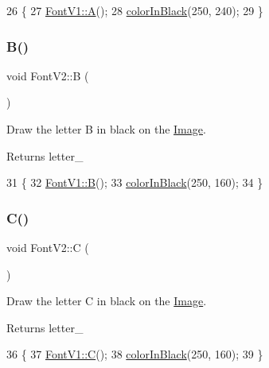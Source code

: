\begin{DoxyCode}
26                \{
27     \mbox{\hyperlink{class_font_v1_a29afd2079bc41cdec9d3de6bb4e1be52}{FontV1::A}}();
28     \mbox{\hyperlink{class_font_v2_a04f2501961bc286ce70fbb6a840b0e8a}{colorInBlack}}(250, 240);
29 \}
\end{DoxyCode}
\mbox{\label{class_font_v2_a0a895c96067874028864303ab64ce889}} 
\subsubsection{\texorpdfstring{B()}{B()}}
{\footnotesize\ttfamily void Font\+V2\+::B (\begin{DoxyParamCaption}{ }\end{DoxyParamCaption})}



Draw the letter B in black on the \mbox{\hyperlink{class_image}{Image}}. 

\begin{DoxyReturn}{Returns}
letter\+\_\+ 
\end{DoxyReturn}

\begin{DoxyCode}
31                \{
32     \mbox{\hyperlink{class_font_v1_a620ee7876d479807f73481f27be48f2a}{FontV1::B}}();
33     \mbox{\hyperlink{class_font_v2_a04f2501961bc286ce70fbb6a840b0e8a}{colorInBlack}}(250, 160);
34 \}
\end{DoxyCode}
\mbox{\label{class_font_v2_ab7dc3a07d1442bd391513c4c202f2a43}} 
\subsubsection{\texorpdfstring{C()}{C()}}
{\footnotesize\ttfamily void Font\+V2\+::C (\begin{DoxyParamCaption}{ }\end{DoxyParamCaption})}



Draw the letter C in black on the \mbox{\hyperlink{class_image}{Image}}. 

\begin{DoxyReturn}{Returns}
letter\+\_\+ 
\end{DoxyReturn}

\begin{DoxyCode}
36                \{
37     \mbox{\hyperlink{class_font_v1_a80602716ae6907fa518fbb50eeda2515}{FontV1::C}}();
38     \mbox{\hyperlink{class_font_v2_a04f2501961bc286ce70fbb6a840b0e8a}{colorInBlack}}(250, 160);
39 \}
\end{DoxyCode}
\mbox{\label{class_font_v2_a04f2501961bc286ce70fbb6a840b0e8a}} 

